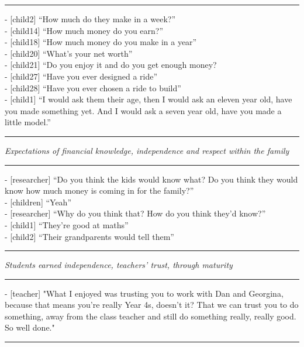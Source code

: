 \par\noindent\rule{\textwidth}{1pt}

- [child2] “How much do they make in a week?”\\
- [child14] “How much money do you earn?”\\
- [child18] “How much money do you make in a year”\\
- [child20] “What’s your net worth”\\
- [child21] “Do you enjoy it and do you get enough money?\\
- [child27] “Have you ever designed a ride”\\
- [child28] “Have you ever chosen a ride to build”\\
- [child1] “I would ask them their age, then I would ask an eleven year old, have you made something yet. And I would ask a seven year old, have you made a little model.”

\par\noindent\rule{\textwidth}{1pt}

\textit{Expectations of financial knowledge, independence and respect within the family}

\par\noindent\rule{\textwidth}{1pt}

- [researcher] “Do you think the kids would know what? Do you think they would know how much money is coming in for the family?”\\
- [children] “Yeah”\\
- [researcher] “Why do you think that? How do you think they’d know?”\\
- [child1] “They’re good at maths”\\
- [child2] “Their grandparents would tell them”

\par\noindent\rule{\textwidth}{1pt}

\textit{Students earned independence, teachers’ trust, through maturity}

\par\noindent\rule{\textwidth}{1pt}

- [teacher] "What I enjoyed was trusting you to work with Dan and Georgina, because that means you're really Year 4s, doesn't it? That we can trust you to do something, away from the class teacher and still do something really, really good. So well done."

{\centering
  \noindent\rule{0.5\textwidth}{0.4pt}\par
}

